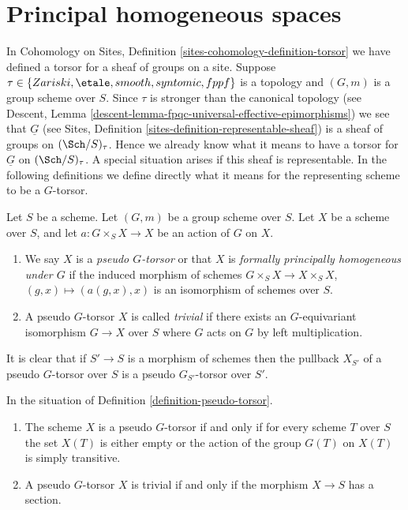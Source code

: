\section{Principal homogeneous spaces}
\label{section-principal-homogeneous}

\noindent
In
Cohomology on Sites, Definition \ref{sites-cohomology-definition-torsor}
we have defined a torsor for a sheaf of groups on a site.
Suppose $\tau \in \{Zariski, \etale, smooth, syntomic, fppf\}$ is a
topology and $(G, m)$ is a group scheme over $S$. Since $\tau$ is stronger than
the canonical topology (see
Descent, Lemma \ref{descent-lemma-fpqc-universal-effective-epimorphisms})
we see that $\underline{G}$ (see
Sites, Definition \ref{sites-definition-representable-sheaf})
is a sheaf of groups on $(\Sch/S)_\tau$.
Hence we already know what it means to have a
torsor for $\underline{G}$ on $(\Sch/S)_\tau$. A special situation
arises if this sheaf is representable. In the following definitions
we define directly what it means for the representing scheme to be a
$G$-torsor.

\begin{definition}
\label{definition-pseudo-torsor}
Let $S$ be a scheme.
Let $(G, m)$ be a group scheme over $S$.
Let $X$ be a scheme over $S$, and let
$a : G \times_S X \to X$ be an action of $G$ on $X$.
\begin{enumerate}
\item We say $X$ is a {\it pseudo $G$-torsor} or that $X$ is
{\it formally principally homogeneous under $G$} if the induced
morphism of schemes $G \times_S X \to X \times_S X$,
$(g, x) \mapsto (a(g, x), x)$ is an isomorphism of schemes over $S$.
\item A pseudo $G$-torsor $X$ is called {\it trivial} if there exists
an $G$-equivariant isomorphism $G \to X$ over $S$ where $G$ acts on
$G$ by left multiplication.
\end{enumerate}
\end{definition}

\noindent
It is clear that if $S' \to S$ is a morphism of schemes then
the pullback $X_{S'}$ of a pseudo $G$-torsor over $S$ is a
pseudo $G_{S'}$-torsor over $S'$.

\begin{lemma}
\label{lemma-characterize-trivial-pseudo-torsors}
In the situation of
Definition \ref{definition-pseudo-torsor}.
\begin{enumerate}
\item The scheme $X$ is a pseudo $G$-torsor if and only if for every scheme
$T$ over $S$ the set $X(T)$ is either empty or the action of the group $G(T)$
on $X(T)$ is simply transitive.
\item A pseudo $G$-torsor $X$ is trivial if and only if the morphism
$X \to S$ has a section.
\end{enumerate}
\end{lemma}

